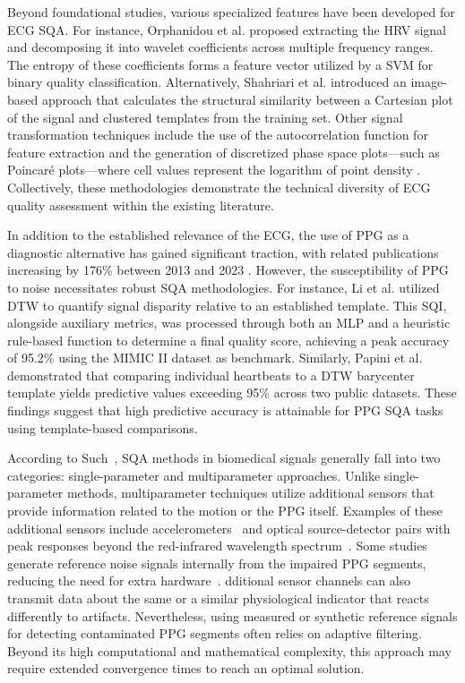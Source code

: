 \documentclass[final,3p,times,twocolumn]{elsarticle}
\begin{document}
Beyond foundational studies, various specialized features have been developed for \gls{ECG} \gls{SQA}.
For instance, Orphanidou et al. \cite{ecg-3} proposed extracting the \gls{HRV} signal and decomposing it into wavelet coefficients across multiple frequency ranges.
The entropy of these coefficients forms a feature vector utilized by a \gls{SVM} for binary quality classification.
Alternatively, Shahriari et al. \cite{ecg-4} introduced an image-based approach that calculates the structural similarity between a Cartesian plot of the signal and clustered templates from the training set.
Other signal transformation techniques include the use of the autocorrelation function for feature extraction \cite{ecg-5} and the generation of discretized phase space plots—such as Poincaré plots—where cell values represent the logarithm of point density \cite{ecg-6}.
Collectively, these methodologies demonstrate the technical diversity of \gls{ECG} quality assessment within the existing literature.


In addition to the established relevance of the \gls{ECG}, the use of \gls{PPG} as a diagnostic alternative has gained significant traction, with related publications increasing by 176\% between 2013 and 2023 \cite{ppg-1}.
However, the susceptibility of \gls{PPG} to noise necessitates robust \gls{SQA} methodologies.
For instance, Li et al. \cite{ppg-2} utilized \gls{DTW} to quantify signal disparity relative to an established template.
This \gls{SQI}, alongside auxiliary metrics, was processed through both an \gls{MLP} and a heuristic rule-based function to determine a final quality score, achieving a peak accuracy of 95.2\% using the MIMIC II dataset as benchmark.
Similarly, Papini et al. \cite{ppg-3} demonstrated that comparing individual heartbeats to a \gls{DTW} barycenter template yields predictive values exceeding 95\% across two public datasets. These findings suggest that high predictive accuracy is attainable for \gls{PPG} \gls{SQA} tasks using template-based comparisons.


According to Such~\cite{such2007motion}, \gls{SQA} methods in biomedical signals generally fall into two categories: single-parameter and multiparameter approaches.
Unlike single-parameter methods, multiparameter techniques utilize additional sensors that provide information related to the motion or the \gls{PPG} itself.
Examples of these additional sensors include accelerometers~\cite{nabavi2020robust, tuauctan2015characterization} and optical source-detector pairs with peak responses beyond the red-infrared wavelength spectrum~\cite{zhang2019motion}.
Some studies generate reference noise signals internally from the impaired \gls{PPG} segments, reducing the need for extra hardware~\cite{ram2011novel, raghuram2016use}.
dditional sensor channels can also transmit data about the same or a similar physiological indicator that reacts differently to artifacts.
Nevertheless, using measured or synthetic reference signals for detecting contaminated \gls{PPG} segments often relies on adaptive filtering.
Beyond its high computational and mathematical complexity, this approach may require extended convergence times to reach an optimal solution.
\end{document}
